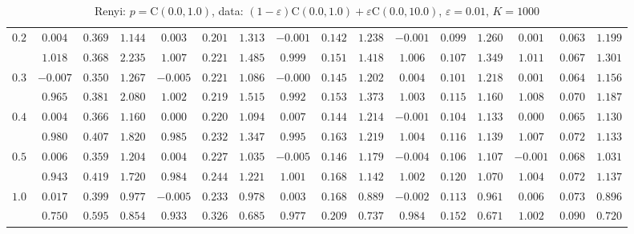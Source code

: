 \documentclass[11pt]{article}
\begin{document}
\begin{table}[ht]
\begin{center}
\begin{tabular}{|c|ccc|ccc|ccc|ccc|ccc|}
\hline 
$0.2$ & $ 0.004 $ & $ 0.369 $ & $ 1.144 $ & $ 0.003 $ & $ 0.201 $ & $ 1.313 $ & $ -0.001 $ & $ 0.142 $ & $ 1.238 $ & $ -0.001 $ & $ 0.099 $ & $ 1.260 $ & $ 0.001 $ & $ 0.063 $ & $ 1.199 $\\ 
 & $ 1.018 $ & $ 0.368 $ & $ 2.235 $ & $ 1.007 $ & $ 0.221 $ & $ 1.485 $ & $ 0.999 $ & $ 0.151 $ & $ 1.418 $ & $ 1.006 $ & $ 0.107 $ & $ 1.349 $ & $ 1.011 $ & $ 0.067 $ & $ 1.301 $\\ 
\hline 
$0.3$ & $ -0.007 $ & $ 0.350 $ & $ 1.267 $ & $ -0.005 $ & $ 0.221 $ & $ 1.086 $ & $ -0.000 $ & $ 0.145 $ & $ 1.202 $ & $ 0.004 $ & $ 0.101 $ & $ 1.218 $ & $ 0.001 $ & $ 0.064 $ & $ 1.156 $\\ 
 & $ 0.965 $ & $ 0.381 $ & $ 2.080 $ & $ 1.002 $ & $ 0.219 $ & $ 1.515 $ & $ 0.992 $ & $ 0.153 $ & $ 1.373 $ & $ 1.003 $ & $ 0.115 $ & $ 1.160 $ & $ 1.008 $ & $ 0.070 $ & $ 1.187 $\\ 
\hline 
$0.4$ & $ 0.004 $ & $ 0.366 $ & $ 1.160 $ & $ 0.000 $ & $ 0.220 $ & $ 1.094 $ & $ 0.007 $ & $ 0.144 $ & $ 1.214 $ & $ -0.001 $ & $ 0.104 $ & $ 1.133 $ & $ 0.000 $ & $ 0.065 $ & $ 1.130 $\\ 
 & $ 0.980 $ & $ 0.407 $ & $ 1.820 $ & $ 0.985 $ & $ 0.232 $ & $ 1.347 $ & $ 0.995 $ & $ 0.163 $ & $ 1.219 $ & $ 1.004 $ & $ 0.116 $ & $ 1.139 $ & $ 1.007 $ & $ 0.072 $ & $ 1.133 $\\ 
\hline 
$0.5$ & $ 0.006 $ & $ 0.359 $ & $ 1.204 $ & $ 0.004 $ & $ 0.227 $ & $ 1.035 $ & $ -0.005 $ & $ 0.146 $ & $ 1.179 $ & $ -0.004 $ & $ 0.106 $ & $ 1.107 $ & $ -0.001 $ & $ 0.068 $ & $ 1.031 $\\ 
 & $ 0.943 $ & $ 0.419 $ & $ 1.720 $ & $ 0.984 $ & $ 0.244 $ & $ 1.221 $ & $ 1.001 $ & $ 0.168 $ & $ 1.142 $ & $ 1.002 $ & $ 0.120 $ & $ 1.070 $ & $ 1.004 $ & $ 0.072 $ & $ 1.137 $\\ 
\hline 
$1.0$ & $ 0.017 $ & $ 0.399 $ & $ 0.977 $ & $ -0.005 $ & $ 0.233 $ & $ 0.978 $ & $ 0.003 $ & $ 0.168 $ & $ 0.889 $ & $ -0.002 $ & $ 0.113 $ & $ 0.961 $ & $ 0.006 $ & $ 0.073 $ & $ 0.896 $\\ 
 & $ 0.750 $ & $ 0.595 $ & $ 0.854 $ & $ 0.933 $ & $ 0.326 $ & $ 0.685 $ & $ 0.977 $ & $ 0.209 $ & $ 0.737 $ & $ 0.984 $ & $ 0.152 $ & $ 0.671 $ & $ 1.002 $ & $ 0.090 $ & $ 0.720 $\\ 
\hline 
\end{tabular}
\caption{Renyi: $p = \mathrm{C}(0.0,1.0)$, data: $(1-\varepsilon)\mathrm{C}(0.0,1.0) + \varepsilon \mathrm{C}(0.0,10.0)$, $\varepsilon =  0.01$, $K = 1000$} 
\end{center}
\end{table}
\end{document}
